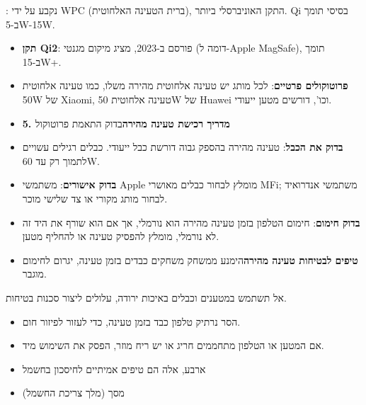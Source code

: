 
: נקבע על ידי WPC (ברית הטעינה האלחוטית), התקן האוניברסלי ביותר. Qi בסיסי תומך ב-5W-15W.

\begin{itemize}
  \item \textbf{תקן Qi2}: פורסם ב-2023, מציג מיקום מגנטי (דומה ל-Apple MagSafe), תומך ב-15W+.
  \item \textbf{פרוטוקולים פרטיים}: לכל מותג יש טעינה אלחוטית מהירה משלו, כמו טעינה אלחוטית 50W של Xiaomi, טעינה אלחוטית 50W של Huawei וכו', דורשים מטען ייעודי.
  \item \textbf{5. מדריך רכישת טעינה מהירה}בדוק התאמת פרוטוקול
\end{itemize}


\begin{itemize}
  \item \textbf{בדוק את הכבל}: טעינה מהירה בהספק גבוה דורשת כבל ייעודי. כבלים רגילים עשויים לתמוך רק עד 60W.
  \item \textbf{בדוק אישורים}: משתמשי Apple מומלץ לבחור כבלים מאושרי MFi; משתמשי אנדרואיד לבחור מותג מקורי או צד שלישי מוכר.
  \item \textbf{בדוק חימום}: חימום הטלפון בזמן טעינה מהירה הוא נורמלי, אך אם הוא שורף את היד זה לא נורמלי, מומלץ להפסיק טעינה או להחליף מטען.
  \item \textbf{טיפים לבטיחות טעינה מהירה}הימנע ממשחק משחקים כבדים בזמן טעינה, יגרום לחימום מוגבר.
\end{itemize}

\begin{tcbwarn}{אל תשתמש במטענים וכבלים באיכות ירודה, עלולים ליצור סכנות בטיחות.}
\begin{itemize}
  \item הסר נרתיק טלפון כבד בזמן טעינה, כדי לעזור לפיזור חום.
  \item אם המטען או הטלפון מתחממים חריג או יש ריח מוזר, הפסק את השימוש מיד.
  \item ארבע, אלה הם טיפים אמיתיים לחיסכון בחשמל
  \item מסך (מלך צריכת החשמל)
\end{itemize}

\end{tcbwarn}


